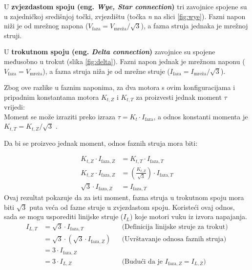 \documentclass[diplomskirad]{fer}
\begin{document}
U \textbf{zvjezdastom spoju (eng. \textit{Wye, Star connection})} tri zavojnice
spojene su u zajedničkoj središnjoj točki, zvjezdištu (točka \textit{n} na
slici \ref{fig:wye}). Fazni napon niži je od mrežnog napona ($V_{\text{faza}} =
	V_{\text{mreža}} / \sqrt{3}$), a fazna struja jednaka je mrežnoj struji.

U \textbf{trokutnom spoju (eng. \textit{Delta connection})} zavojnice su
spojene međusobno u trokut (slika \ref{fig:delta}). Fazni napon jednak je
mrežnom naponu ($V_{\text{faza}} = V_{\text{mreža}}$), a fazna struja niža je
od mrežne struje ($I_{\text{faza}} = I_{\text{mreža}} / \sqrt{3}$).

Zbog ove razlike u faznim naponima, za dva motora s ovim konfiguracijama i
pripadnim konstantama motora $K_{t, Z}$ i $K_{t, T}$ za proizvesti jednak
moment $\tau$ vrijedi: \\

Moment se može izraziti preko izraza $\tau = K_t \cdot I_{\text{faza}}$, a
odnos konstanti momenta je $K_{t, T} = K_{t, Z} / \sqrt{3}$
\cite{cite:disertacija}.

Da bi se proizveo jednak moment, odnos faznih struja mora biti:

\begin{align*}
	K_{t,Z} \cdot I_{\text{faza},Z}  & = K_{t,T} \cdot I_{\text{faza},T}                                 \\
	K_{t,Z} \cdot I_{\text{faza},Z}  & = \left( \frac{K_{t,Z}}{\sqrt{3}} \right) \cdot I_{\text{faza},T} \\
	\sqrt{3} \cdot I_{\text{faza},Z} & = I_{\text{faza},T}
\end{align*}
Ovaj rezultat pokazuje da za isti moment, fazna struja u trokutnom spoju mora biti $\sqrt{3}$ puta veća od fazne struje u zvjezdastom spoju.
Koristeći ovaj odnos, sada se mogu usporediti linijske struje ($I_L$) koje motori vuku iz izvora napajanja.
\begin{align*}
	I_{L,T} & = \sqrt{3} \cdot I_{\text{faza},T}                  &  & \text{(Definicija linijske struje za trokut)}              \\
	        & = \sqrt{3} \cdot (\sqrt{3} \cdot I_{\text{faza},Z}) &  & \text{(Uvrštavanje odnosa faznih struja)}                  \\
	        & = 3 \cdot I_{\text{faza},Z}                                                                                         \\
	        & = 3 \cdot I_{L,Z}                                   &  & \text{(Budući da je } I_{\text{faza},Z} = I_{L,Z} \text{)}
\end{align*}
\end{document}
